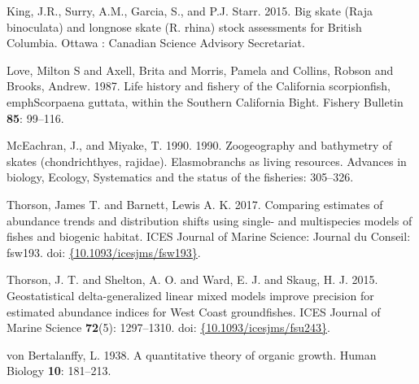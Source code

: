 \documentclass[12pt,]{article}
\begin{document}
\leavevmode\hypertarget{ref-King2015}{}%
King, J.R., Surry, A.M., Garcia, S., and P.J. Starr. 2015. Big skate
(Raja binoculata) and longnose skate (R. rhina) stock assessments for
British Columbia. Ottawa : Canadian Science Advisory Secretariat.

\leavevmode\hypertarget{ref-Love1987}{}%
Love, Milton S and Axell, Brita and Morris, Pamela and Collins, Robson
and Brooks, Andrew. 1987. Life history and fishery of the California
scorpionfish,\\
emphScorpaena guttata, within the Southern California Bight. Fishery
Bulletin \textbf{85}: 99--116.

\leavevmode\hypertarget{ref-McEachran1990}{}%
McEachran, J., and Miyake, T. 1990. 1990. Zoogeography and bathymetry of
skates (chondrichthyes, rajidae). Elasmobranchs as living resources.
Advances in biology, Ecology, Systematics and the status of the
fisheries: 305--326.

\leavevmode\hypertarget{ref-Thorson2017a}{}%
Thorson, James T. and Barnett, Lewis A. K. 2017. Comparing estimates of
abundance trends and distribution shifts using single- and multispecies
models of fishes and biogenic habitat. ICES Journal of Marine Science:
Journal du Conseil: fsw193. doi:
\href{https://doi.org/\%7B10.1093/icesjms/fsw193\%7D}{\{10.1093/icesjms/fsw193\}}.

\leavevmode\hypertarget{ref-Thorson2015}{}%
Thorson, J. T. and Shelton, A. O. and Ward, E. J. and Skaug, H. J. 2015.
Geostatistical delta-generalized linear mixed models improve precision
for estimated abundance indices for West Coast groundfishes. ICES
Journal of Marine Science \textbf{72}(5): 1297--1310. doi:
\href{https://doi.org/\%7B10.1093/icesjms/fsu243\%7D}{\{10.1093/icesjms/fsu243\}}.

\leavevmode\hypertarget{ref-vonBertalanffy1938}{}%
von Bertalanffy, L. 1938. A quantitative theory of organic growth. Human
Biology \textbf{10}: 181--213.
\end{document}
